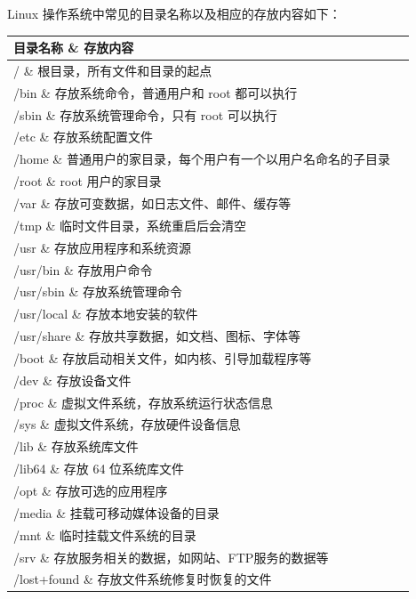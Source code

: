 \documentclass[12pt,UTF8]{ctexbook}
\begin{document}
Linux 操作系统中常见的目录名称以及相应的存放内容如下：

\begin{tabularx}{\textwidth}{|l|X|}
    \hline
    \textbf{目录名称} \& \textbf{存放内容} \\
    \hline
    / \& 根目录，所有文件和目录的起点 \\
    \hline
    /bin \& 存放系统命令，普通用户和 root 都可以执行 \\
    \hline
    /sbin \& 存放系统管理命令，只有 root 可以执行 \\
    \hline
    /etc \& 存放系统配置文件 \\
    \hline
    /home \& 普通用户的家目录，每个用户有一个以用户名命名的子目录 \\
    \hline
    /root \& root 用户的家目录 \\
    \hline
    /var \& 存放可变数据，如日志文件、邮件、缓存等 \\
    \hline
    /tmp \& 临时文件目录，系统重启后会清空 \\
    \hline
    /usr \& 存放应用程序和系统资源 \\
    \hline
    /usr/bin \& 存放用户命令 \\
    \hline
    /usr/sbin \& 存放系统管理命令 \\
    \hline
    /usr/local \& 存放本地安装的软件 \\
    \hline
    /usr/share \& 存放共享数据，如文档、图标、字体等 \\
    \hline
    /boot \& 存放启动相关文件，如内核、引导加载程序等 \\
    \hline
    /dev \& 存放设备文件 \\
    \hline
    /proc \& 虚拟文件系统，存放系统运行状态信息 \\
    \hline
    /sys \& 虚拟文件系统，存放硬件设备信息 \\
    \hline
    /lib \& 存放系统库文件 \\
    \hline
    /lib64 \& 存放 64 位系统库文件 \\
    \hline
    /opt \& 存放可选的应用程序 \\
    \hline
    /media \& 挂载可移动媒体设备的目录 \\
    \hline
    /mnt \& 临时挂载文件系统的目录 \\
    \hline
    /srv \& 存放服务相关的数据，如网站、FTP服务的数据等 \\
    \hline
    /lost+found \& 存放文件系统修复时恢复的文件 \\
    \hline
\end{tabularx}
\end{document}
